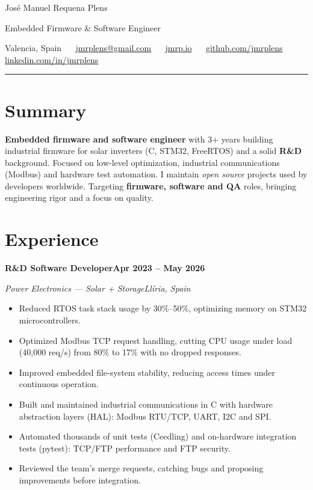 \documentclass[11pt,a4paper]{article}
\let\jmrpsection\section
\renewcommand{\section}[1]{\needspace{4\baselineskip}\jmrpsection{#1}}
\newcommand{\cventry}[4]{%
  \textbf{#1}\hfill\textbf{#4}\par
  {\color{muted}\textit{#2}\hfill\textit{#3}}\par
  \vspace{2pt}
}
\newcommand{\divider}{\textcolor{muted}{\ \raisebox{0.4ex}{\scriptsize$\bullet$}\ }}
\begin{document}
{\headingfont\fontsize{22pt}{24pt}\selectfont José Manuel Requena Plens}\par
\vspace{2pt}
{\large\color{accent}Embedded Firmware \& Software Engineer}\par
\vspace{4pt}
{\small\color{muted}%
Valencia, Spain \divider
\href{mailto:jmrplens@gmail.com}{jmrplens@gmail.com} \divider
\href{https://jmrp.io}{jmrp.io} \divider
\href{https://github.com/jmrplens}{github.com/jmrplens} \divider
\href{https://www.linkedin.com/in/jmrplens}{linkedin.com/in/jmrplens}%
}\par
\vspace{2pt}
{\color{accent}\rule{\linewidth}{1.2pt}}

\section{Summary}
\textbf{Embedded firmware and software engineer} with 3+ years building industrial firmware for solar inverters (C, STM32, FreeRTOS) and a solid \textbf{R\&D} background. Focused on low-level optimization, industrial communications (Modbus) and hardware test automation. I maintain \textit{open source} projects used by developers worldwide. Targeting \textbf{firmware, software and QA} roles, bringing engineering rigor and a focus on quality.

\section{Experience}
\cventry{R\&D Software Developer}{Power Electronics — Solar + Storage}{Llíria, Spain}{Apr 2023 – May 2026}
\begin{itemize}
  \item Reduced RTOS task stack usage by 30\%–50\%, optimizing memory on STM32 microcontrollers.
  \item Optimized Modbus TCP request handling, cutting CPU usage under load (40,000 req/s) from 80\% to 17\% with no dropped responses.
  \item Improved embedded file-system stability, reducing access times under continuous operation.
  \item Built and maintained industrial communications in C with hardware abstraction layers (HAL): Modbus RTU/TCP, UART, I2C and SPI.
  \item Automated thousands of unit tests (Ceedling) and on-hardware integration tests (pytest): TCP/FTP performance and FTP security.
  \item Reviewed the team's merge requests, catching bugs and proposing improvements before integration.
\end{itemize}\vspace{2pt}
\end{document}
